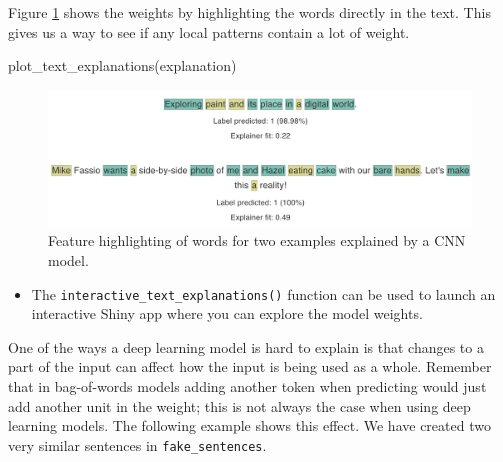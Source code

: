 \documentclass[
]{krantz}
\makeatletter
\newenvironment{Shaded}{\begin{snugshade}}{\end{snugshade}}
\newcommand{\FunctionTok}[1]{\textcolor[rgb]{0.00,0.00,0.00}{#1}}
\newcommand{\NormalTok}[1]{#1}
\newenvironment{kframe}{%
\medskip{}
\setlength{\fboxsep}{.8em}
 \def\at@end@of@kframe{}%
 \ifinner\ifhmode%
  \def\at@end@of@kframe{\end{minipage}}%
  \begin{minipage}{\columnwidth}%
 \fi\fi%
 \def\FrameCommand##1{\hskip\@totalleftmargin \hskip-\fboxsep
 \colorbox{shadecolor}{##1}\hskip-\fboxsep
     \hskip-\linewidth \hskip-\@totalleftmargin \hskip\columnwidth}%
 \MakeFramed {\advance\hsize-\width
   \@totalleftmargin\z@ \linewidth\hsize
   \@setminipage}}%
 {\par\unskip\endMakeFramed%
 \at@end@of@kframe}
\renewenvironment{Shaded}{\begin{kframe}}{\end{kframe}}
\newenvironment{rmdblock}[1]
  {\begin{shaded*}
  \begin{itemize}[left = -1cm, labelsep = 1cm]
  \renewcommand{\labelitemi}{
    \raisebox{-.7\height}[0pt][0pt]{
      {\setkeys{Gin}{width=3em,keepaspectratio}\texttt{[image: images/\#1]}}
    }
  }
 
  \item
  }
  {
  \end{itemize}
  \end{shaded*}
  }
\newenvironment{rmdnote}
  {\begin{rmdblock}{note}}
  {\end{rmdblock}}
\makeatother
\begin{document}
Figure \ref{fig:limeplottextexplanations} shows the weights by highlighting the words directly in the text. This gives us a way to see if any local patterns contain a lot of weight.

\begin{Shaded}
\begin{Highlighting}[]
\FunctionTok{plot\_text\_explanations}\NormalTok{(explanation)}
\end{Highlighting}
\end{Shaded}

\begin{figure}

{\centering \includegraphics[width=0.9\linewidth]{images/plot_text_explanations_1} 

}

\caption{Feature highlighting of words for two examples explained by a CNN model.}\label{fig:limeplottextexplanations}
\end{figure}

\begin{rmdnote}
The \texttt{interactive\_text\_explanations()} function can be used to
launch an interactive Shiny app where you can explore the model weights.
\end{rmdnote}

One of the ways a deep learning model is hard to explain is that changes to a part of the input can affect how the input is being used as a whole. Remember that in bag-of-words models adding another token when predicting would just add another unit in the weight; this is not always the case when using deep learning models.
The following example shows this effect. We have created two very similar sentences in \texttt{fake\_sentences}.
\end{document}
